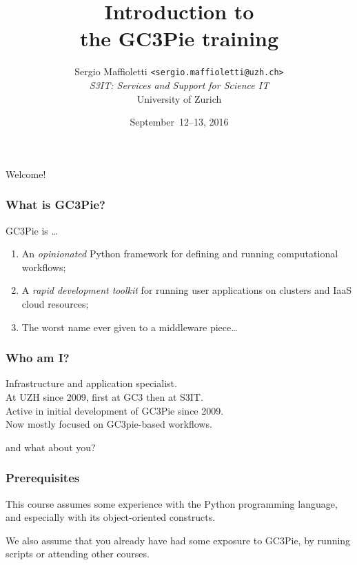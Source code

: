 \documentclass[english,serif,mathserif,xcolor=pdftex,dvipsnames,table]{beamer}
\title[Introduction]{%
  Introduction to \\ the GC3Pie training
}
\author[R. Maffioletti, S3IT UZH]{%
  Sergio Maffioletti \texttt{<sergio.maffioletti@uzh.ch>}
  \\[1ex]
  \emph{S3IT: Services and Support for Science IT}
  \\[1ex]
  University of Zurich
}
\date{September~12--13, 2016}
\begin{document}
\maketitle

\begin{frame}
  \begin{center}
    {\Huge Welcome!}
  \end{center}
\end{frame}


\begin{frame}
  \frametitle{What is GC3Pie?}
  GC3Pie is \ldots
  \begin{enumerate}
  \item \alert<2>{An \emph{opinionated} Python framework for defining and running computational workflows;}
  \item A \emph{rapid development toolkit} for running user applications on clusters and IaaS cloud resources;
  \item The worst name ever given to a middleware piece\ldots
  \end{enumerate}

  \+
\end{frame}


\begin{frame}
  \frametitle{Who am I?}
  \begin{center}
    Infrastructure and application specialist.
    \\ \+
    At UZH since 2009, first at GC3 then at S3IT.
    \\ \+
    Active in initial development of GC3Pie since 2009.
    \\ \+
    Now mostly focused on GC3pie-based workflows.
  \end{center}
\end{frame}


\begin{frame}
  \begin{center}
    {\Huge and what about you?}
  \end{center}
\end{frame}


\begin{frame}
  \frametitle{Prerequisites}
  This course assumes some experience with the Python programming
  language, and especially with its  object-oriented constructs.

  \+
  We also assume that you already have had some exposure to GC3Pie,
  by running scripts or attending other courses.
\end{frame}
\end{document}
